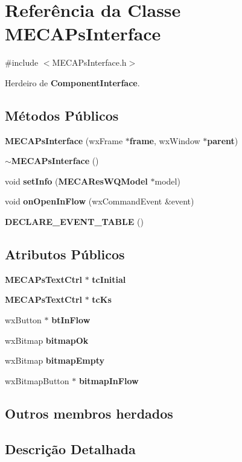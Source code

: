 \section{Referência da Classe M\+E\+C\+A\+Ps\+Interface}
\label{class_m_e_c_a_ps_interface}


{\ttfamily \#include $<$M\+E\+C\+A\+Ps\+Interface.\+h$>$}



Herdeiro de {\bf Component\+Interface}.

\subsection*{Métodos Públicos}
\begin{DoxyCompactItemize}
\item 
{\bf M\+E\+C\+A\+Ps\+Interface} (wx\+Frame $\ast${\bf frame}, wx\+Window $\ast${\bf parent})
\item 
{\bf $\sim$\+M\+E\+C\+A\+Ps\+Interface} ()
\item 
void {\bf set\+Info} ({\bf M\+E\+C\+A\+Res\+W\+Q\+Model} $\ast$model)
\item 
void {\bf on\+Open\+In\+Flow} (wx\+Command\+Event \&event)
\item 
{\bf D\+E\+C\+L\+A\+R\+E\+\_\+\+E\+V\+E\+N\+T\+\_\+\+T\+A\+B\+LE} ()
\end{DoxyCompactItemize}
\subsection*{Atributos Públicos}
\begin{DoxyCompactItemize}
\item 
{\bf M\+E\+C\+A\+Ps\+Text\+Ctrl} $\ast$ {\bf tc\+Initial}
\item 
{\bf M\+E\+C\+A\+Ps\+Text\+Ctrl} $\ast$ {\bf tc\+Ks}
\item 
wx\+Button $\ast$ {\bf bt\+In\+Flow}
\item 
wx\+Bitmap {\bf bitmap\+Ok}
\item 
wx\+Bitmap {\bf bitmap\+Empty}
\item 
wx\+Bitmap\+Button $\ast$ {\bf bitmap\+In\+Flow}
\end{DoxyCompactItemize}
\subsection*{Outros membros herdados}


\subsection{Descrição Detalhada}


